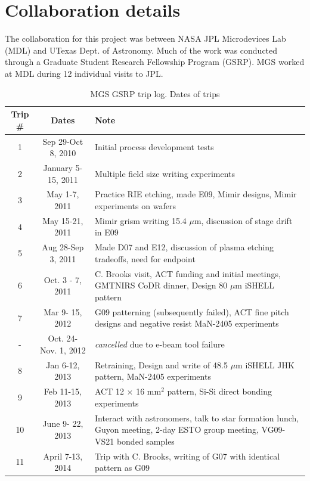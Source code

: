 \documentclass[]{spie}  %
\begin{document}
\appendix    %
\section{Collaboration details} \label{sec:GSRP}
The collaboration for this project was between NASA JPL Microdevices Lab (MDL) and UTexas Dept. of Astronomy.  Much of the work was conducted through a Graduate Student Research Fellowship Program (GSRP).  MGS worked at MDL during 12 individual visits to JPL.

\begin{table}
	\caption{MGS GSRP trip log.  Dates of trips }
	\begin{tabular}{ccp{8cm}}
	\hline
	 Trip \# &Dates & Note\\
	\hline
	1 & Sep 29-Oct 8, 2010 & Initial process development tests \\
	2 & January 5-15, 2011 & Multiple field size writing experiments\\
	3 & May 1-7, 2011 & Practice RIE etching, made E09, Mimir designs, Mimir experiments on wafers\\	
	4 & May 15-21, 2011 & Mimir grism writing 15.4 $\mu$m, discussion of stage drift in E09  \\	
	5 & Aug 28-Sep 3, 2011 & Made D07 and E12, discussion of plasma etching tradeoffs, need for endpoint\\		
	6 & Oct. 3 - 7, 2011 & C. Brooks visit, ACT funding and initial meetings, GMTNIRS CoDR dinner, Design 80 $\mu$m iSHELL pattern\\
	7 & Mar 9- 15, 2012 & G09 patterning (subsequently failed), ACT fine pitch designs and negative resist MaN-2405 experiments\\
	-  & Oct. 24- Nov. 1, 2012 & \emph{cancelled} due to e-beam tool failure \\
	8 & Jan 6-12, 2013 & Retraining, Design and write of 48.5 $\mu$m iSHELL JHK pattern, MaN-2405 experiments\\
	9 & Feb 11-15, 2013 & ACT 12 $\times$ 16 mm$^2$ pattern, Si-Si direct bonding experiments\\
	10 & June 9- 22, 2013 & Interact with astronomers, talk to star formation lunch, Guyon meeting, 2-day ESTO group meeting, VG09-VS21 bonded samples\\
	11 & April 7-13, 2014 & Trip with C. Brooks, writing of G07 with identical pattern as G09\\
	\hline
	\end{tabular}
\end{table}
\end{document}
